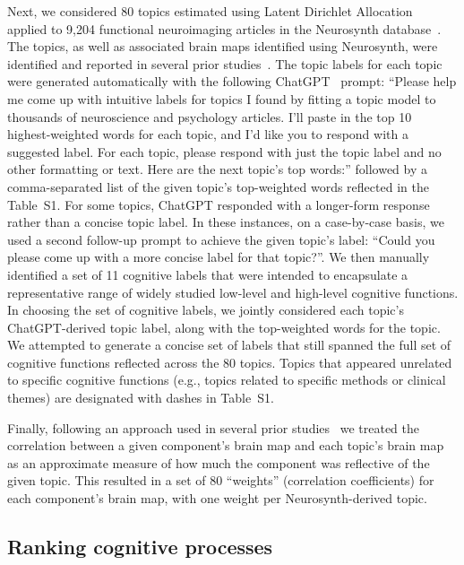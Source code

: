 \documentclass[english, 11pt]{article}
\newcommand{\topics}{S1}
\begin{document}
Next, we considered 80 topics estimated using Latent Dirichlet
Allocation~\citep{BleiEtal03} applied to 9,204 functional neuroimaging articles
in the Neurosynth database~\citep{RubiEtal17}. The topics, as well as
associated brain maps identified using Neurosynth, were identified and reported
in several prior studies~\citep{FoxEtal14, SulEtal17, ChenEtal20}. The topic
labels for each topic were generated automatically with the following
ChatGPT~\citep{ChatGPT} prompt: ``Please help me come up with intuitive labels
for topics I found by fitting a topic model to thousands of neuroscience and
psychology articles. I'll paste in the top 10 highest-weighted words for each
topic, and I'd like you to respond with a suggested label. For each topic,
please respond with just the topic label and no other formatting or text. Here
are the next topic's top words:'' followed by a comma-separated list of the
given topic's top-weighted words reflected in the Table~\topics. For some
topics, ChatGPT responded with a longer-form response rather than a concise
topic label. In these instances, on a case-by-case basis, we used a second
follow-up prompt to achieve the given topic's label: ``Could you please come up
with a more concise label for that topic?''. We then manually identified a set
of 11 cognitive labels that were intended to encapsulate a representative range
of widely studied low-level and high-level cognitive functions. In choosing the
set of cognitive labels, we jointly considered each topic's ChatGPT-derived
topic label, along with the top-weighted words for the topic. We attempted to
generate a concise set of labels that still spanned the full set of cognitive
functions reflected across the 80 topics. Topics that appeared unrelated to
specific cognitive functions (e.g., topics related to specific methods or
clinical themes) are designated with dashes in Table~\topics.

Finally, following an approach used in several prior studies~\citep{FoxEtal14,
SulEtal17, ChenEtal20} we treated the correlation between a given component's
brain map and each topic's brain map as an approximate measure of how much the
component was reflective of the given topic. This resulted in a set of 80
``weights'' (correlation coefficients) for each component's brain map, with one
weight per Neurosynth-derived topic.

\subsection*{Ranking cognitive processes}
\end{document}
